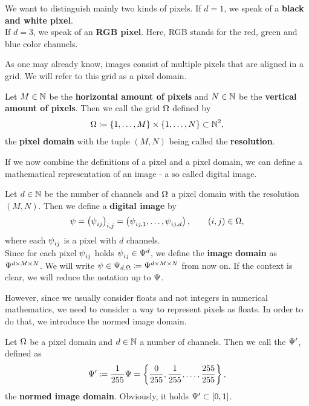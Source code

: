 \begin{remark}
We want to distinguish mainly two kinds of pixels. If $d=1$, we speak of a \textbf{black and white pixel}.\\
If $d=3$, we speak of an \textbf{RGB pixel}. Here, RGB stands for the  red, green and blue color channels.
\end{remark}


As one may already know, images consist of multiple pixels that are aligned in a grid. We will refer to this grid as a pixel domain.


\begin{definition}\label{def:pixel_domain}
Let $M\in\N$ be the \textbf{horizontal amount of pixels} and $N\in\N$ be the \textbf{vertical amount of pixels}. Then we call the grid $\O$ defined by
\begin{align*}
\O \coloneqq \left\{1, \ldots, M\right\} \times \left\{1,\ldots, N\right\} \subset \N^2,
\end{align*}
the \textbf{pixel domain} with the tuple $(M,N)$ being called the \textbf{resolution}.
\end{definition}


If we now combine the definitions of a pixel and a pixel domain, we can define a mathematical representation of an image - a so called digital image.


\begin{definition}\label{def:image}
Let $d\in\N$ be the number of channels and $\O$ a pixel domain with the resolution $(M,N)$. Then we define a \textbf{digital image} by
\begin{align*}
\p=\left(\p_{ij}\right)_{i,j} = \left(\p_{ij,1},\ldots,\p_{ij,d} \right),\qquad (i,j)\in\O,
\end{align*}
where each $\p_{ij}$ is a pixel with $d$ channels.\\
Since for each pixel $\p_{ij}$ holds $\p_{ij}\in\P^d$, we define the \textbf{image domain} as $\P^{d\times M\times N}$. We will write $\p\in\P_{d,\O}\coloneqq \P^{d \times M\times N}$ from now on. If the context is clear, we will reduce the notation up to $\P$.
\end{definition}


However, since we usually consider floats and not integers in numerical mathematics, we need to consider a way to represent pixels as floats. In order to do that, we introduce the normed image domain.


\begin{definition}
Let $\O$ be a pixel domain and  $d\in\N$ a number of channels. Then we call the $\P^\prime$, defined as
\begin{align*}
\P^\prime \coloneqq \frac{1}{255} \P = \left\{\frac{0}{255}, \frac{1}{255}, \ldots, \frac{255}{255} \right\},
\end{align*}
the \textbf{normed image domain}. Obviously, it holds $\P^\prime \subset [0,1]$.
\end{definition}


